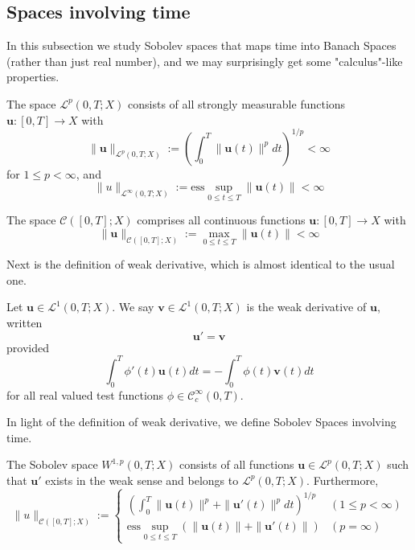 \documentclass{article}
\begin{document}
\subsection{Spaces involving time}

\indent\indent In this subsection we study Sobolev spaces that maps time into Banach Spaces (rather than just real number), and we may surprisingly get some "calculus"-like properties.

\begin{Def}
    The space $\mathscr{L}^p(0, T; X)$ consists of all strongly measurable functions $\textbf{u}: [0, T]\to X$ with 
    $$
        \|\textbf{u}\|_{\mathscr{L}^p(0, T;X)}:= \left(\int_0^T\|\textbf{u}(t)\|^pdt\right)^{1/p}<\infty
    $$ for $1\leq p<\infty$, and
    $$
    \|u\|_{\mathscr{L}^\infty(0,T; X)}:= \text{ess}\sup\limits_{0\leq t\leq T}\|\textbf{u}(t)\|<\infty
    $$
\end{Def}

\begin{Def}
    The space $\mathscr{C}([0, T]; X)$ comprises all continuous functions $\textbf{u}: [0, T]\to X$ with 
    $$
    \|\textbf{u}\|_{\mathscr{C}([0, T]; X)}:= \max_{0\leq t\leq T}\|\textbf{u}(t)\|<\infty
    $$
\end{Def}

\indent Next is the definition of weak derivative, which is almost identical to the usual one.

\begin{Def}
    Let $\textbf{u}\in\mathscr{L}^1(0,T; X)$. We say $\textbf{v}\in\mathscr{L}^1(0,T;X)$ is the weak derivative of $\textbf{u}$, written 
    $$
        \textbf{u}'=\textbf{v}
    $$
    provided 
    $$
    \int_0^T\phi'(t)\textbf{u}(t)dt=-\int_0^T\phi(t)\textbf{v}(t)dt
    $$ for all real valued test functions $\phi\in\mathscr{C}_c^\infty(0,T)$.
\end{Def}

\indent In light of the definition of weak derivative, we define Sobolev Spaces involving time.

\begin{Def}
    The Sobolev space $W^{1,p}(0, T; X)$ consists of all functions $\textbf{u}\in\mathscr{L}^p(0,T;X)$ such that $\textbf{u}'$ exists in the weak sense and belongs to $\mathscr{L}^p(0,T;X)$. Furthermore, 
    $$\|u\|_{\mathscr{C}([0,T];X)}:=\begin{cases}
  \left(\int_{0}^T\|\textbf{u}(t)\|^p+\|\textbf{u}'(t)\|^pdt\right)^{1/p}& (1\leq p<\infty) \\
  \text{ess}\sup\limits_{0\leq t\leq T}(\|\textbf{u}(t)\|+\|\textbf{u}'(t)\|)& (p=\infty)
    \end{cases}$$
\end{Def}
\end{document}
